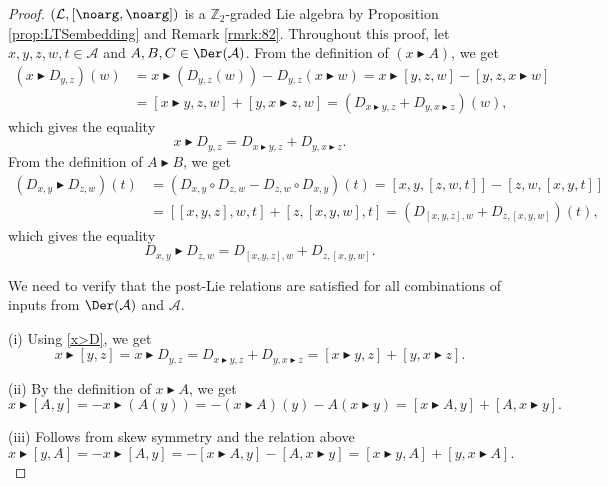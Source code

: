 \documentclass[pdftex]{sigma}
\numberwithin{equation}{section}
\begin{document}
\begin{proof}
$(\mathcal{L},[\noarg,\noarg])$ is a $\mathbb{Z}_2$-graded Lie algebra by Proposition \ref{prop:LTSembedding} and Remark \ref{rmrk:82}. Throughout this proof, let $x,y,z,w,t \in \mathcal{A}$ and $A,B,C \in \Der(\mathcal{A})$. From the definition of $(x\blacktriangleright A)$, we get
\begin{align*}
 (x \blacktriangleright D_{y,z})(w) & = x \blacktriangleright (D_{y,z}(w)) - D_{y,z}(x\blacktriangleright w)
 = x \blacktriangleright [y,z,w] - [y,z,x \blacktriangleright w] \\
 & = [x \blacktriangleright y, z, w] + [y,x\blacktriangleright z, w]
 = (D_{x\blacktriangleright y,z} + D_{y,x \blacktriangleright z})(w),
\end{align*}
which gives the equality
\begin{equation}\label{x>D}
 x \blacktriangleright D_{y,z} = D_{x\blacktriangleright y,z} + D_{y,x \blacktriangleright z}.
\end{equation}
From the definition of $A\blacktriangleright B$, we get
\begin{align*}
 (D_{x,y}\blacktriangleright D_{z,w})(t) & = (D_{x,y} \circ D_{z,w} - D_{z,w} \circ D_{x,y})(t)
 = [x,y,[z,w,t]] - [z,w,[x,y,t]] \\
 & = [[x,y,z],w,t] + [z,[x,y,w],t]
 = (D_{[x,y,z],w} + D_{z,[x,y,w]})(t),
\end{align*}
which gives the equality
\begin{equation}\label{A>B}
 D_{x,y}\blacktriangleright D_{z,w} = D_{[x,y,z],w} + D_{z,[x,y,w]}.
\end{equation}

We need to verify that the post-Lie relations are satisfied for all combinations of inputs from $\Der(\mathcal{A})$ and $\mathcal{A}$.

(i) Using \eqref{x>D}, we get
 \[
 x \blacktriangleright [y,z] = x \blacktriangleright D_{y,z} = D_{x \blacktriangleright y,z} + D_{y,x \blacktriangleright z} = [x \blacktriangleright y,z ] + [y, x\blacktriangleright z].
 \]

(ii) By the definition of $x \blacktriangleright A$, we get
 \[
 x \blacktriangleright [A,y] = - x \blacktriangleright(A(y)) = -(x\blacktriangleright A)(y) - A(x\blacktriangleright y) = [x \blacktriangleright A ,y] + [A, x \blacktriangleright y].
 \]

(iii) Follows from skew symmetry and the relation above
 \[
 x \blacktriangleright [y,A] = -x \blacktriangleright [A,y] = - [x \blacktriangleright A ,y] - [A, x \blacktriangleright y] = [x \blacktriangleright y,A] + [y, x \blacktriangleright A].
 \]


\end{proof}
\end{document}
